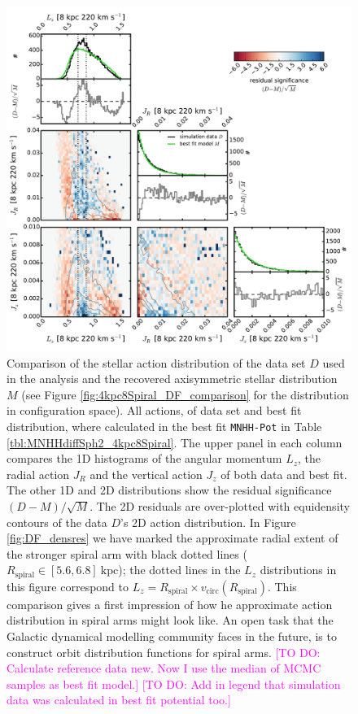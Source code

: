 \documentclass[iop,revtex4,numberedappendix,appendixfloats]{emulateapj}
\newcommand{\Wilma}[1]{\textcolor{Magenta}{#1}}
\begin{document}
\begin{figure}[!htbp]
\centering
\includegraphics[width=\columnwidth]{fig/MNdHHdiffSph2_4kpc8Spiral_a_data_bestfit_residuals_only_actions.pdf}
\caption{Comparison of the stellar action distribution of the data set $D$ used in the analysis and the recovered axisymmetric stellar distribution $M$ (see Figure \ref{fig:4kpc8Spiral_DF_comparison} for the distribution in configuration space). All actions, of data set and best fit distribution, where calculated in the best fit \texttt{MNHH-Pot} in Table \ref{tbl:MNHHdiffSph2_4kpc8Spiral}. The upper panel in each column compares the 1D histograms of the  angular momentum $L_z$, the radial action $J_R$ and the vertical action $J_z$ of both data and best fit. The other 1D and 2D distributions show the residual significance $(D-M)/\sqrt{M}$. The 2D residuals are over-plotted with equidensity contours of the data $D$'s 2D action distribution. In Figure \ref{fig:DF_densres} we have marked the approximate radial extent of the stronger spiral arm with black dotted lines ($R_\text{spiral} \in [5.6,6.8]~\text{kpc}$); the dotted lines in the $L_z$ distributions in this figure correspond to $L_z = R_\text{spiral} \times v_\text{circ}(R_\text{spiral})$. This comparison gives a first impression of how he approximate action distribution in spiral arms might look like. An open task that the Galactic dynamical modelling community faces in the future, is to construct orbit distribution functions for spiral arms. \Wilma{[TO DO: Calculate reference data new. Now I use the median of MCMC samples as best fit model.]} \Wilma{[TO DO: Add in legend that simulation data was calculated in best fit potential too.]}}
\label{fig:4kpc8Spiral_actions}
\end{figure}
\end{document}
